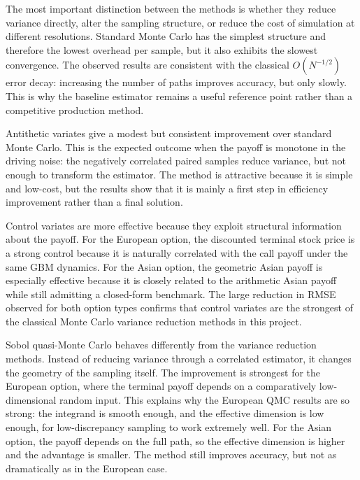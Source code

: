 \documentclass[11pt]{article}
\begin{document}
The most important distinction between the methods is whether they reduce variance directly, alter the sampling structure, or reduce the cost of simulation at different resolutions. Standard Monte Carlo has the simplest structure and therefore the lowest overhead per sample, but it also exhibits the slowest convergence. The observed results are consistent with the classical $O(N^{-1/2})$ error decay: increasing the number of paths improves accuracy, but only slowly. This is why the baseline estimator remains a useful reference point rather than a competitive production method.

Antithetic variates give a modest but consistent improvement over standard Monte Carlo. This is the expected outcome when the payoff is monotone in the driving noise: the negatively correlated paired samples reduce variance, but not enough to transform the estimator. The method is attractive because it is simple and low-cost, but the results show that it is mainly a first step in efficiency improvement rather than a final solution.

Control variates are more effective because they exploit structural information about the payoff. For the European option, the discounted terminal stock price is a strong control because it is naturally correlated with the call payoff under the same GBM dynamics. For the Asian option, the geometric Asian payoff is especially effective because it is closely related to the arithmetic Asian payoff while still admitting a closed-form benchmark. The large reduction in RMSE observed for both option types confirms that control variates are the strongest of the classical Monte Carlo variance reduction methods in this project.

Sobol quasi-Monte Carlo behaves differently from the variance reduction methods. Instead of reducing variance through a correlated estimator, it changes the geometry of the sampling itself. The improvement is strongest for the European option, where the terminal payoff depends on a comparatively low-dimensional random input. This explains why the European QMC results are so strong: the integrand is smooth enough, and the effective dimension is low enough, for low-discrepancy sampling to work extremely well. For the Asian option, the payoff depends on the full path, so the effective dimension is higher and the advantage is smaller. The method still improves accuracy, but not as dramatically as in the European case.
\end{document}
